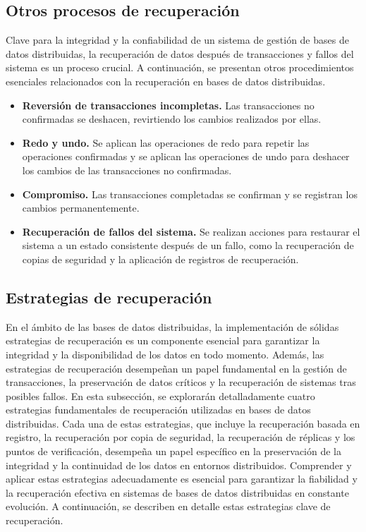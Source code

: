 \subsection{Otros procesos de recuperación}
\noindent
Clave para la integridad y la confiabilidad de un sistema de gestión de bases de datos distribuidas, la recuperación de datos después de transacciones y fallos del sistema es un proceso crucial. A continuación, se presentan otros procedimientos esenciales relacionados con la recuperación en bases de datos distribuidas.

\begin{itemize}
	\item \textbf{Reversión de transacciones incompletas.} Las transacciones no confirmadas se deshacen, revirtiendo los cambios realizados por ellas.
	\item \textbf{Redo y undo.} Se aplican las operaciones de redo para repetir las operaciones confirmadas y se aplican las operaciones de undo para deshacer los cambios de las transacciones no confirmadas.
	\item \textbf{Compromiso.} Las transacciones completadas se confirman y se registran los cambios permanentemente.
	\item \textbf{Recuperación de fallos del sistema.} Se realizan acciones para restaurar el sistema a un estado consistente después de un fallo, como la recuperación de copias de seguridad y la aplicación de registros de recuperación.
\end{itemize}

\subsection{Estrategias de recuperación}
\noindent
En el ámbito de las bases de datos distribuidas, la implementación de sólidas estrategias de recuperación es un componente esencial para garantizar la integridad y la disponibilidad de los datos en todo momento. Además, las estrategias de recuperación desempeñan un papel fundamental en la gestión de transacciones, la preservación de datos críticos y la recuperación de sistemas tras posibles fallos. En esta subsección, se explorarán detalladamente cuatro estrategias fundamentales de recuperación utilizadas en bases de datos distribuidas. Cada una de estas estrategias, que incluye la recuperación basada en registro, la recuperación por copia de seguridad, la recuperación de réplicas y los puntos de verificación, desempeña un papel específico en la preservación de la integridad y la continuidad de los datos en entornos distribuidos. Comprender y aplicar estas estrategias adecuadamente es esencial para garantizar la fiabilidad y la recuperación efectiva en sistemas de bases de datos distribuidas en constante evolución. A continuación, se describen en detalle estas estrategias clave de recuperación.


